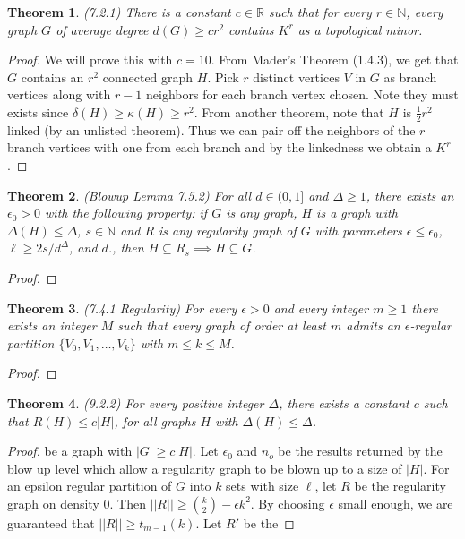 \documentclass[12pt]{article}
\newtheorem{theorem}{Theorem}
\begin{document}
\begin{theorem} (7.2.1) There is a constant $c \in \mathbb{R}$ such
  that for every $r \in \mathbb{N}$, every graph $G$ of average degree
  $d(G) \geq cr^2$ contains $K^r$ as a topological minor.
\end{theorem}
\begin{proof} We will prove this with $c = 10$. From Mader's Theorem
  (1.4.3), we get that $G$ contains an $r^2$ connected graph $H$. Pick
  $r$ distinct vertices $V$ in $G$ as branch vertices along with $r-1$
  neighbors for each branch vertex chosen. Note they must exists since
  $\delta(H) \geq \kappa(H) \geq r^2$. From another theorem, note that
  $H$ is $\frac{1}{2}r^2$ linked (by an unlisted theorem). Thus we can
  pair off the neighbors of the $r$ branch vertices with one from each
  branch and by the linkedness we obtain a $K^r$.
\end{proof}

\begin{theorem} (Blowup Lemma 7.5.2) For all $d \in (0, 1]$ and
  $\Delta \geq 1$, there exists an $\epsilon_0 > 0$ with the following
  property: if $G$ is any graph, $H$ is a graph with
  $\Delta(H) \leq \Delta$, $s \in \mathbb{N}$ and $R$ is any
  regularity graph of $G$ with parameters $\epsilon \leq \epsilon_0$,
  $\ell \geq 2s/d^\Delta$, and $d$., then
  $H \subseteq R_s \implies H \subseteq G$.
\end{theorem}
\begin{proof}
\end{proof}

\begin{theorem} (7.4.1 Regularity) For every $\epsilon > 0$ and every
  integer $m \geq 1$ there exists an integer $M$ such that every graph
  of order at least $m$ admits an $\epsilon$-regular partition
  $\{V_0, V_1, \ldots, V_k\}$ with $m \leq k \leq M$.
\end{theorem}
\begin{proof}
\end{proof}

\begin{theorem} (9.2.2) For every positive integer $\Delta$, there
  exists a constant $c$ such that $R(H) \leq c |H|$, for all graphs
  $H$ with $\Delta(H) \leq \Delta$.
\end{theorem}
\begin{proof} %
  be a graph with $|G| \geq c |H|$. Let $\epsilon_0$ and $n_o$ be the
  results returned by the blow up level which allow a regularity graph
  to be blown up to a size of $|H|$. For an epsilon regular partition
  of $G$ into $k$ sets with size $\ell$, let $R$ be the regularity
  graph on density $0$. Then
  $||R|| \geq {k \choose 2} - \epsilon k^2$. By choosing $\epsilon$
  small enough, we are guaranteed that $||R|| \geq t_{m - 1}(k)$. Let
  $R'$ be the
\end{proof}
\end{document}

